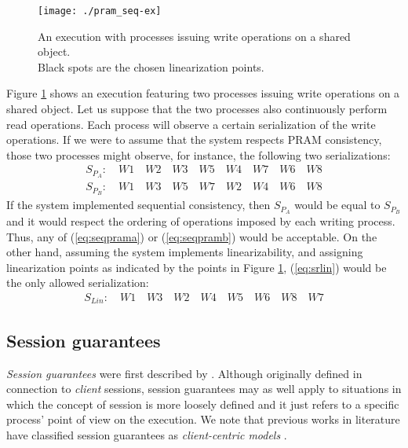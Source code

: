 \documentclass[letter, 11pt]{article}
\newcommand{\citeN}{\citet}
\renewcommand{\cite}{\citep}
\begin{document}
\begin{figure}[h]
	\centering
	\texttt{[image: ./pram\_seq-ex]} 	\caption{An execution with processes issuing write operations on a shared object.\\
	Black spots are the chosen linearization points.}
	\label{fig:pram_seq-ex}
\end{figure}
Figure \ref{fig:pram_seq-ex} shows an execution featuring two processes issuing 
write operations on a shared object.
Let us suppose that the two processes also continuously perform read operations. Each process will observe a certain serialization of the write operations.
If we were to assume that the system respects PRAM consistency, those two processes might observe, for instance, 
the following two serializations:
\begin{align} 
\label{eq:seqprama}
S_{P_{A}} : \quad W1 \quad W2 \quad W3 \quad W5 \quad W4 \quad W7 \quad W6 \quad W8\tag{S.1}\\
\label{eq:seqpramb}
S_{P_{B}} : \quad W1 \quad W3 \quad W5 \quad W7 \quad W2 \quad W4 \quad W6 \quad W8\tag{S.2}
\end{align}
If the system implemented sequential consistency, then $S_{P_{A}}$ would be equal to $S_{P_{B}}$ and 
it would respect the ordering of operations imposed by each writing process.
Thus, any of (\ref{eq:seqprama}) or (\ref{eq:seqpramb}) would be acceptable.
On the other hand, assuming the system implements linearizability, and assigning linearization points as indicated by the points  
in Figure \ref{fig:pram_seq-ex}, (\ref{eq:srlin}) would be the only allowed serialization:
\begin{align} 
\label{eq:srlin}
S_{Lin} : \quad W1 \quad W3 \quad W2 \quad W4 \quad W5 \quad W6 \quad W8 \quad W7 \tag{S.3} 
\end{align}



\subsection{Session guarantees} 
\label{subsec:session}
\emph{Session guarantees} were first described by \citeN{Terry.Demers.ea:94}.
Although originally defined in connection to \emph{client} sessions, session guarantees may as well apply to situations in which the concept of session
is more loosely defined and it just refers to a specific process' point of view on the execution. 
We note that previous works in literature have classified session guarantees as \emph{client-centric models} \cite{Tanenbaum.Steen:07}. 
\end{document}
